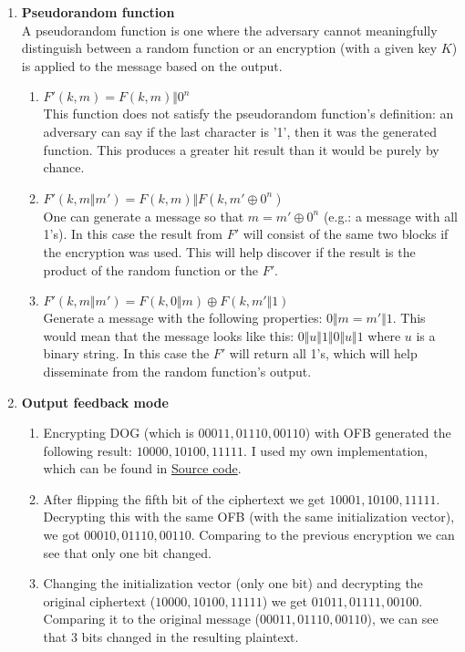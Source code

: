 \documentclass{article}
\begin{document}
\begin{enumerate}[label=\textbf{Task \arabic*:}]
		\item \textbf{Pseudorandom function} \\
		A pseudorandom function is one where the adversary cannot meaningfully distinguish between a random function or an encryption (with a given key $K$) is applied to the message based on the output.
		\begin{enumerate}[label=-]
			\item $ F'(k, m) = F(k, m) \Vert 0^n $ \\
			This function does not satisfy the pseudorandom function's definition: an adversary can say if the last character is '1', then it was the generated function. This produces a greater hit result than it would be purely by chance.
			\item $ F'(k, m \Vert m') = F(k, m) \Vert F(k, m' \oplus 0^n) $ \\
			One can generate a message so that $m = m' \oplus 0^n$ (e.g.: a message with all 1's). In this case the result from $F'$ will consist of the same two blocks if the encryption was used. This will help discover if the result is the product of the random function or the $F'$.
			\item $ F'(k, m \Vert m') = F(k, 0 \Vert m) \oplus F(k, m' \Vert 1) $\\
			Generate a message with the following properties: $ 0 \Vert m = m' \Vert 1 $. This would mean that the message looks like this: $ 0 \Vert u \Vert 1 \Vert 0 \Vert u \Vert 1 $ where $u$ is a binary string. In this case the $F'$ will return all 1's, which will help disseminate from the random function's output.
		\end{enumerate}
		\item \textbf{Output feedback mode}\\
		\begin{enumerate}[label=\textit{Part \roman*:}]
			\item Encrypting \textsc{DOG} (which is $00011, 01110, 00110$) with OFB generated the following result: $10000, 10100, 11111$. I used my own implementation, which can be found in \hyperlink{https://github.com/halkszavu/Encryption-Homework-2025}{Source code}.
			\item After flipping the fifth bit of the ciphertext we get $10001, 10100, 11111$. Decrypting this with the same OFB (with the same initialization vector), we got $00010, 01110, 00110$. Comparing to the previous encryption we can see that only one bit changed.
			\item Changing the initialization vector (only one bit) and decrypting the original ciphertext ($10000, 10100, 11111$) we get $01011, 01111, 00100$. Comparing it to the original message ($00011, 01110, 00110$), we can see that 3 bits changed in the resulting plaintext.
		\end{enumerate}
				

\end{enumerate}
\end{document}
